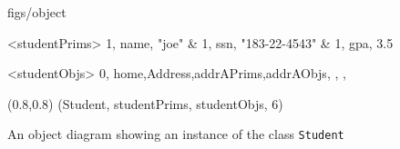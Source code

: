 





\begin {figure}


\Draw

 {figs/object}


\Indirect \Table <studentPrims>
{  1, name, "joe" 		&
   1, ssn,  "183-22-4543"		&
   1, gpa,  3.5		
}


\Indirect \Table <studentObjs>
 {  0, home,Address,addrAPrims,addrAObjs, , , }
  


\Scale (0.8,0.8)
\OD (Student, studentPrims, studentObjs, 6)
    
\EndDraw

\caption {An object diagram showing an instance
of the class \texttt {Student}}

\label {fig:simpleStudent}

\end {figure}



